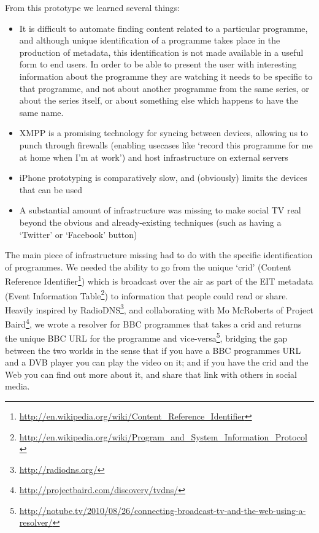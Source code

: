 \documentclass{notube}
\begin{document}
From this prototype we learned several things:

\begin{itemize}
\item{It is difficult to automate finding content related to a particular programme, and although unique identification of a programme takes place in the production of metadata, this identification is not made available in a useful form to end users. In order to be able to present the user with interesting information about the programme they are watching it needs to be specific to that programme, and not about another programme from the same series, or about the series itself, or about something else which happens to have the same name.}
\item{XMPP is a promising technology for syncing between devices, allowing us to punch through firewalls (enabling usecases like `record this programme for me at home when I'm at work') and host infrastructure on external servers}
\item{iPhone prototyping is comparatively slow, and (obviously) limits the devices that can be used}
\item{A substantial amount of infrastructure was missing to make social TV real beyond the obvious and already-existing techniques (such as having a `Twitter' or `Facebook' button)}
\end{itemize}

The main piece of infrastructure missing had to do with the specific identification of programmes. We needed the ability to go from the unique `crid' (Content Reference Identifier\footnote{\url{http://en.wikipedia.org/wiki/Content_Reference_Identifier}}) which is broadcast over the air as part of the EIT metadata (Event Information Table\footnote{\url{http://en.wikipedia.org/wiki/Program_and_System_Information_Protocol}}) to information that people could read or share. Heavily inspired by RadioDNS\footnote{\url{http://radiodns.org/}}, and collaborating with Mo McRoberts of Project Baird\footnote{\url{http://projectbaird.com/discovery/tvdns/}}, we wrote a resolver for BBC programmes that takes a crid and returns the unique BBC URL for the programme and vice-versa\footnote{\url{http://notube.tv/2010/08/26/connecting-broadcast-tv-and-the-web-using-a-resolver/}}, bridging the gap between the two worlds in the sense that if you have a BBC programmes URL and a DVB player you can play the video on it; and if you have the crid and the Web you can find out more about it, and share that link with others in social media.
\end{document}
